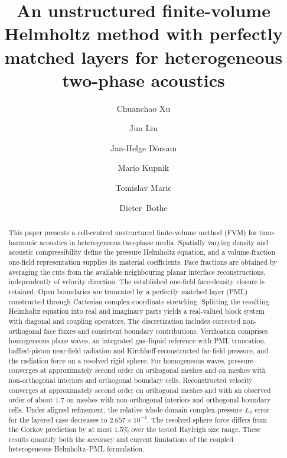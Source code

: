 \documentclass[final,12pt,nopreprintline,longtitle]{elsarticle}
\begin{document}
\begin{frontmatter}

\title{An unstructured finite-volume Helmholtz method with perfectly matched layers for heterogeneous two-phase acoustics}

\author[mma]{Chuanchao Xu}
\author[mma]{Jun Liu}
\author[must]{Jan-Helge Dörsam}
\author[must]{Mario Kupnik}
\author[mma]{Tomislav Maric\texorpdfstring{}{}}
\author[mma]{Dieter~Bothe}


\begin{abstract}
This paper presents a cell-centred unstructured finite-volume method (FVM) for
time-harmonic acoustics in heterogeneous two-phase media.  Spatially varying
density and acoustic compressibility define the pressure Helmholtz equation,
and a volume-fraction one-field representation supplies its material
coefficients.  Face fractions are obtained by averaging the cuts from the
available neighbouring planar interface reconstructions, independently of
velocity direction.  The established one-field face-density closure is retained.
Open boundaries are truncated by a perfectly matched layer
(PML) constructed through Cartesian complex-coordinate stretching.  Splitting
the resulting Helmholtz equation into real and imaginary parts yields a
real-valued block system with diagonal and coupling operators.  The
discretization includes corrected
non-orthogonal face fluxes and consistent boundary contributions.  Verification
comprises homogeneous plane waves, an integrated gas--liquid reference with
PML truncation,
baffled-piston near-field radiation and Kirchhoff-reconstructed far-field
pressure, and the radiation force on a resolved rigid sphere.
For homogeneous waves, pressure converges at approximately second order on
orthogonal meshes and on meshes with non-orthogonal interiors and orthogonal boundary cells.
Reconstructed velocity converges at approximately second order on orthogonal
meshes and with an observed order of about $1.7$ on meshes with non-orthogonal
interiors and orthogonal boundary cells.  Under aligned refinement, the
relative whole-domain complex-pressure $L_2$ error for the layered case
decreases to $2.657\times10^{-4}$.  The resolved-sphere force differs from the
Gorkov prediction by at most $1.5\%$ over the tested Rayleigh size range.  These
results quantify both the accuracy and current limitations of the coupled
heterogeneous Helmholtz--PML formulation.
\end{abstract}


\end{frontmatter}
\end{document}

